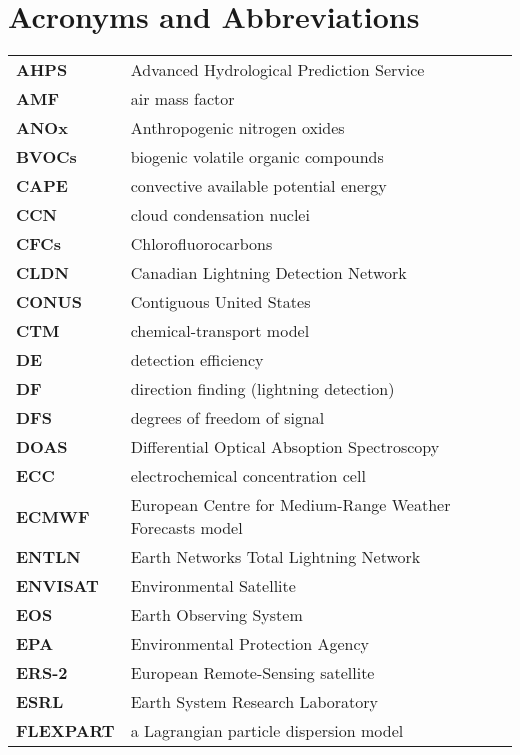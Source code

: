 \chapter{Acronyms and Abbreviations} \label{apdx:abbrev}

\ifpdf
    \graphicspath{{Appendix/figures/PNG/}{Appendix/figures/PDF/}{Appendix/figures/}}
\else
    \graphicspath{{Appendix/figures/EPS/}{Appendix/figures/}}
\fi

\begin{longtable}{p{1.5in}p{5.5in}}
\textbf{AHPS} & Advanced Hydrological Prediction Service\\
\textbf{AMF} & air mass factor\\
\textbf{ANOx} & Anthropogenic nitrogen oxides\\
\textbf{BVOCs} & biogenic volatile organic compounds\\
\textbf{CAPE} & convective available potential energy\\
\textbf{CCN} & cloud condensation nuclei\\
\textbf{CFCs} & Chlorofluorocarbons\\
\textbf{CLDN} & Canadian Lightning Detection Network\\
\textbf{CONUS} & Contiguous United States\\
\textbf{CTM} & chemical-transport model\\
\textbf{DE} & detection efficiency\\
\textbf{DF} & direction finding (lightning detection)\\
\textbf{DFS} & degrees of freedom of signal\\
\textbf{DOAS} & Differential Optical Absoption Spectroscopy\\
\textbf{ECC} & electrochemical concentration cell\\
\textbf{ECMWF} & European Centre for Medium-Range Weather Forecasts model\\
\textbf{ENTLN} & Earth Networks Total Lightning Network\\
\textbf{ENVISAT} & Environmental Satellite\\
\textbf{EOS} & Earth Observing System\\
\textbf{EPA} & Environmental Protection Agency\\
\textbf{ERS-2} & European Remote-Sensing satellite\\
\textbf{ESRL} & Earth System Research Laboratory\\
\textbf{FLEXPART} & a Lagrangian particle dispersion model\\

\end{longtable}
